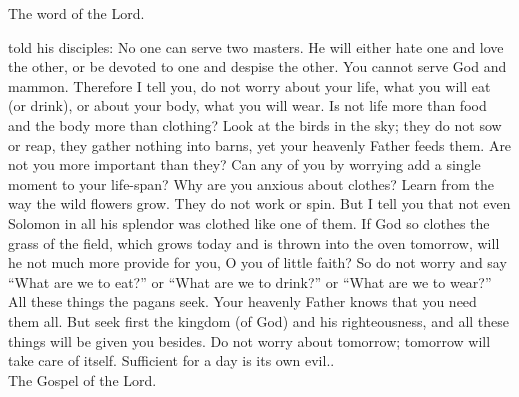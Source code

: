The word of the Lord.\\

 
\vspace{10mm}


\newpage


 told his disciples: \guillemotleft
No one can serve two masters. He will either hate one and
love the other, or be devoted to one and despise the other.
You cannot serve God and mammon. Therefore I tell you,
do not worry about your life, what you will eat (or drink),
or about your body, what you will wear. Is not life more
than food and the body more than clothing?
Look at the birds in the sky; they do not sow or reap,
they gather nothing into barns, yet your heavenly Father feeds them.
Are not you more important than they?
Can any of you by worrying add a single moment to your life-span? 
Why are you anxious about clothes? Learn from the way the wild flowers grow.
They do not work or spin.
But I tell you that not even Solomon in all his splendor was clothed like one of them.
If God so clothes the grass of the field, which grows today
and is thrown into the oven tomorrow, will he not much
more provide for you, O you of little faith?
So do not worry and say ``What are we to eat?'' or ``What are we to drink?'' or
``What are we to wear?''
All these things the pagans seek. Your heavenly Father knows that you need them all.
But seek first the kingdom (of God) and his righteousness,
and all these things will be given you besides.
Do not worry about tomorrow; tomorrow will take care of itself.
Sufficient for a day is its own evil.\guillemotright.\\

The Gospel of the Lord.\\


\vspace{10mm}


\newpage



